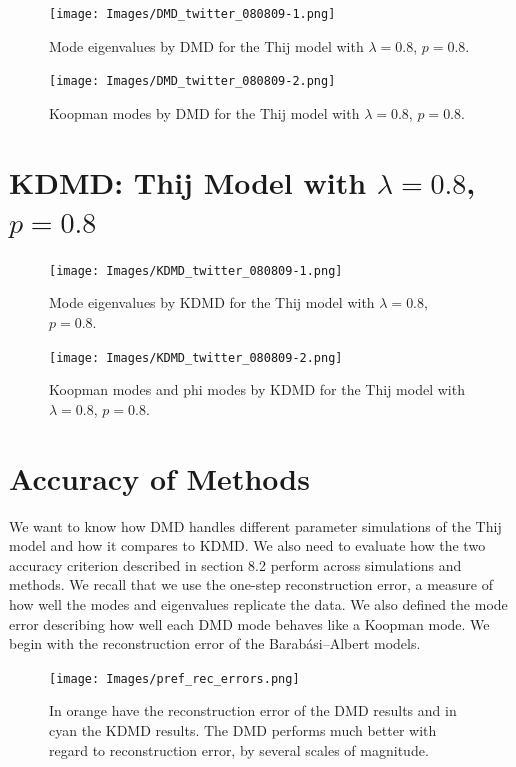 \clearpage

\begin{figure}
    \texttt{[image: Images/DMD\_twitter\_080809-1.png]}
    \centering
    \caption{Mode eigenvalues by DMD for the Thij model
    with $\lambda=0.8$, $p=0.8$.}
    \label{fig:dmd08081}
\end{figure}

\begin{figure}
    \texttt{[image: Images/DMD\_twitter\_080809-2.png]}
    \centering
    \caption{Koopman modes by DMD for the Thij model
    with $\lambda=0.8$, $p=0.8$.}
    \label{fig:dmd08082}
\end{figure}

\clearpage
\section{KDMD: Thij Model with $\lambda=0.8$, $p=0.8$}

\begin{figure}
    \texttt{[image: Images/KDMD\_twitter\_080809-1.png]}
    \centering
    \caption{Mode eigenvalues by KDMD for the Thij model
    with $\lambda=0.8$, $p=0.8$.}
    \label{fig:dmd08083}
\end{figure}

\begin{figure}
    \texttt{[image: Images/KDMD\_twitter\_080809-2.png]}
    \centering
    \caption{Koopman modes and phi modes by KDMD for the Thij model
    with $\lambda=0.8$, $p=0.8$.}
    \label{fig:dmd08084}
\end{figure}

\FloatBarrier
\clearpage

\section{Accuracy of Methods}

We want to know how DMD handles different parameter simulations of the Thij model and how it compares to KDMD.
 We also need to evaluate how the two accuracy criterion described in section 8.2 perform across
simulations and methods. We recall that we use the one-step reconstruction error, a measure of 
how well the modes and eigenvalues replicate the data. We also defined the mode error describing how 
well each DMD mode behaves like a Koopman mode. We begin with the
reconstruction error of the Barabási–Albert models.

\begin{figure}
    \texttt{[image: Images/pref\_rec\_errors.png]}
    \centering
    \caption{In orange have the reconstruction error of the DMD results and in cyan 
    the KDMD results. The DMD performs much better with regard to reconstruction error, by several scales of magnitude.}
    \label{fig:prefrecerror}
\end{figure} 

